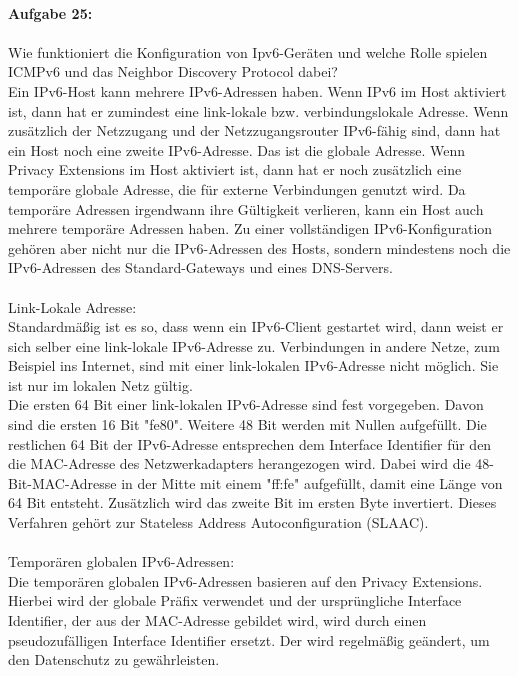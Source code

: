 \documentclass[12pt,a4paper]{report}
\begin{document}
\ \\
\textbf{Aufgabe 25:}
\\
\\
Wie funktioniert die Konfiguration von Ipv6-Geräten und welche Rolle spielen ICMPv6 und das
Neighbor Discovery Protocol dabei?
\\
Ein IPv6-Host kann mehrere IPv6-Adressen haben. Wenn IPv6 im Host aktiviert ist, dann hat er zumindest eine link-lokale bzw. verbindungslokale Adresse. Wenn zusätzlich der Netzzugang und der Netzzugangsrouter IPv6-fähig sind, dann hat ein Host noch eine zweite IPv6-Adresse. Das ist die globale Adresse. Wenn Privacy Extensions im Host aktiviert ist, dann hat er noch zusätzlich eine temporäre globale Adresse, die für externe Verbindungen genutzt wird. Da temporäre Adressen irgendwann ihre Gültigkeit verlieren, kann ein Host auch mehrere temporäre Adressen haben. Zu einer vollständigen IPv6-Konfiguration gehören aber nicht nur die IPv6-Adressen des Hosts, sondern mindestens noch die IPv6-Adressen des Standard-Gateways und eines DNS-Servers.
\\
\\
Link-Lokale Adresse:\\
Standardmäßig ist es so, dass wenn ein IPv6-Client gestartet wird, dann weist er sich selber eine link-lokale IPv6-Adresse zu. Verbindungen in andere Netze, zum Beispiel ins Internet, sind mit einer link-lokalen IPv6-Adresse nicht möglich. Sie ist nur im lokalen Netz gültig.
\\
Die ersten 64 Bit einer link-lokalen IPv6-Adresse sind fest vorgegeben. Davon sind die ersten 16 Bit "fe80". Weitere 48 Bit werden mit Nullen aufgefüllt. Die restlichen 64 Bit der IPv6-Adresse entsprechen dem Interface Identifier für den die MAC-Adresse des Netzwerkadapters herangezogen wird. Dabei wird die 48-Bit-MAC-Adresse in der Mitte mit einem "ff:fe" aufgefüllt, damit eine Länge von 64 Bit entsteht. Zusätzlich wird das zweite Bit im ersten Byte invertiert.
Dieses Verfahren gehört zur Stateless Address Autoconfiguration (SLAAC).
\\
\\
Temporären globalen IPv6-Adressen:\\
Die temporären globalen IPv6-Adressen basieren auf den Privacy Extensions. Hierbei wird der globale Präfix verwendet und der ursprüngliche Interface Identifier, der aus der MAC-Adresse gebildet wird, wird durch einen pseudozufälligen Interface Identifier ersetzt. Der wird regelmäßig geändert, um den Datenschutz zu gewährleisten.
\\
\end{document}
